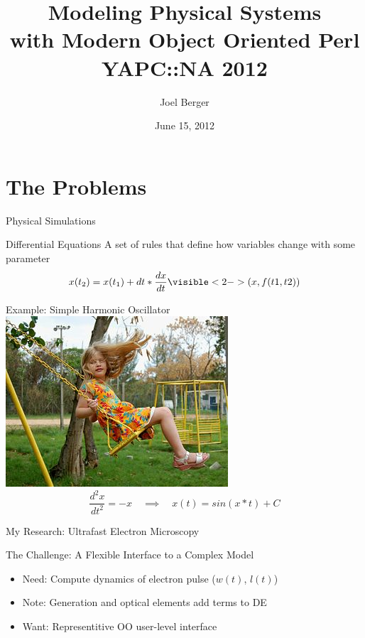 \documentclass[mathserif]{beamer}
\title[OO Physical Modeling]{Modeling Physical Systems\\with Modern Object Oriented Perl\\YAPC::NA 2012}
\author{Joel Berger}
\institute[UIC]{University of Illinois at Chicago}
\date{June 15, 2012}
\begin{document}
\begin{frame}
  \maketitle
\end{frame}

\section{The Problems}

\begin{frame}{Physical Simulations}
  \begin{block}{Differential Equations}
    A set of rules that define how variables change with some parameter
    \begin{equation*}
      x(t_2) = x(t_1) + dt*\frac{dx}{dt}\visible<2->{(x,f(t1,t2))}
    \end{equation*}
  \end{block}
  \begin{block}{Example: Simple Harmonic Oscillator}
    \centering
    \includegraphics[width=0.2\linewidth]{swing.jpg}
    \begin{equation*}
      \frac{d^2x}{dt^2} = -x \quad\implies\quad x(t) = sin(x*t) + C
    \end{equation*}
  \end{block}
\end{frame}

\begin{frame}{My Research: Ultrafast Electron Microscopy}
  
\end{frame}

\begin{frame}{The Challenge: A Flexible Interface to a Complex Model}
  
  \begin{itemize}
    \item<2-> Need: Compute dynamics of electron pulse ($w(t)$, $l(t)$)
    \item<3-> Note: Generation and optical elements add terms to DE
    \item<4-> Want: Representitive OO user-level interface
  \end{itemize}
\end{frame}
\end{document}
